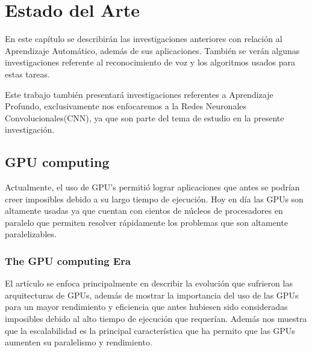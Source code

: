 \chapter{Estado del Arte}
En este capítulo se describirán las investigaciones anteriores con relación al Aprendizaje Automático, además de sus aplicaciones. También se verán algunas investigaciones referente al reconocimiento de voz y los algoritmos usados para estas tareas.

Este trabajo también presentará investigaciones referentes a Aprendizaje Profundo, exclusivamente nos enfocaremos a la Redes Neuronales Convolucionales(CNN), ya que son parte del tema de estudio en la presente investigación.





\section{GPU computing}
Actualmente, el uso de GPU's permitió lograr aplicaciones que antes se podrían creer imposibles debido a su largo tiempo de ejecución. Hoy en día las GPUs son altamente usadas ya que cuentan con cientos de núcleos de procesadores en paralelo que permiten resolver rápidamente los problemas que son altamente paralelizables.
\subsection{The GPU computing Era}
	El artículo se enfoca principalmente en describir la evolución que sufrieron las arquitecturas de GPUs, además de mostrar la importancia del uso de las GPUs para un mayor rendimiento y eficiencia que antes hubiesen sido consideradas imposibles debido al alto tiempo de ejecución que requerían. Además nos muestra que la escalabilidad es la principal característica que ha permito que las GPUs aumenten su paralelismo y rendimiento.

